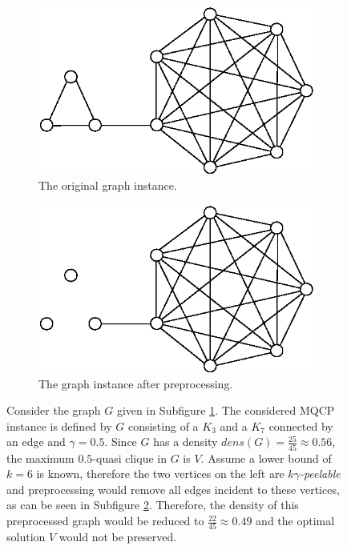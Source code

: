 \documentclass[draft,final]{vutinfth} %
\begin{document}
\begin{figure}
    \centering
    \begin{subfigure}{.5\textwidth}
      \centering
      \includegraphics[width=.9\linewidth]{graphics/preprocessing-mqcp-counterexample-1.eps}
      \caption{The original graph instance.}
      \label{fig:preprocessing-mqcp-sub1}
    \end{subfigure}%
    \begin{subfigure}{.5\textwidth}
      \centering
      \includegraphics[width=.9\linewidth]{graphics/preprocessing-mqcp-counterexample-2.eps}
      \caption{The graph instance after preprocessing.}
      \label{fig:preprocessing-mqcp-sub2}
    \end{subfigure}
    \caption{Consider the graph $G$ given in Subfigure \ref{fig:preprocessing-mqcp-sub1}. The considered MQCP instance is defined by $G$ consisting of a $K_3$ and a $K_7$ connected by an edge and $\gamma=0.5$. Since $G$ has a density $dens(G) = \frac{25}{45} \approx 0.56$, the maximum $0.5$-quasi clique in $G$ is $V$. Assume a lower bound of $k=6$ is known, therefore the two vertices on the left are $k\gamma$\emph{-peelable} and preprocessing would remove all edges incident to these vertices, as can be seen in Subfigure \ref{fig:preprocessing-mqcp-sub2}. Therefore, the density of this preprocessed graph would be reduced to $\frac{22}{45} \approx 0.49$ and the optimal solution $V$ would not be preserved.}
    \label{fig:preprocessing-mqcp-counterexample}
\end{figure}
\end{document}
